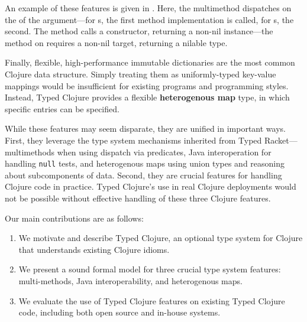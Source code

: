An example of these features is given in
. Here, the  multimethod dispatches
on the  of the argument---for s,
the first method implementation is called, for s, the
second. The  method calls
a  constructor, returning a non-nil  instance---the 
 method 
on  requires a non-nil target, returning a nilable
type.  

Finally, flexible, high-performance immutable dictionaries
are the most common Clojure data structure.
Simply treating them as uniformly-typed
key-value mappings would be insufficient for existing
programs and programming styles. Instead, Typed Clojure provides a
flexible \textbf{heterogenous map} type, in which specific entries can be specified. 

While these features may seem disparate, they are unified in important
ways. First, they leverage the type system mechanisms
inherited from Typed Racket---multimethods when using 
dispatch via predicates, Java interoperation for handling
\texttt{null} tests, and heterogenous maps using union types and
reasoning about subcomponents of data. Second,
they are crucial features for handling Clojure code in
practice. Typed Clojure's use in real Clojure deployments would not be
possible without effective handling of these three Clojure features. 


Our main contributions are as follows:

\begin{enumerate}
  \item We motivate and describe  Typed Clojure, an optional
    type system for Clojure that understands existing Clojure idioms.
  \item We present a sound formal model for three crucial type
    system features: multi-methods, Java
    interoperability, and heterogenous maps.
  \item We evaluate the use of Typed Clojure features on existing
    Typed Clojure code, including both open source and in-house systems.
\end{enumerate}



